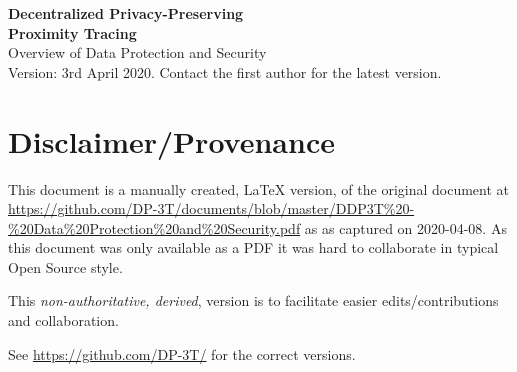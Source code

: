 \documentclass[12pt,a4paper]{article}
\begin{document}
\thispagestyle{specialfooter}
\onehalfspace

\begin{center}{\Large{\bfseries
Decentralized Privacy-Preserving\\
Proximity Tracing}\\[0.5cm]
Overview of Data Protection and Security}\\
Version: 3rd April 2020. Contact the first author for the latest version.\\[1cm]


\section*{Disclaimer/Provenance}

This document is a manually created, LaTeX version, of the original document at \url{https://github.com/DP-3T/documents/blob/master/DDP3T\%20-\%20Data\%20Protection\%20and\%20Security.pdf} as 
as captured on 2020-04-08. As this document was only available as a PDF it was hard to collaborate in typical Open Source style.

This\emph{ non-authoritative, derived}, version is to facilitate easier edits/contributions and collaboration.

See \url{https://github.com/DP-3T/} for the correct versions.
\end{center}
\end{document}
